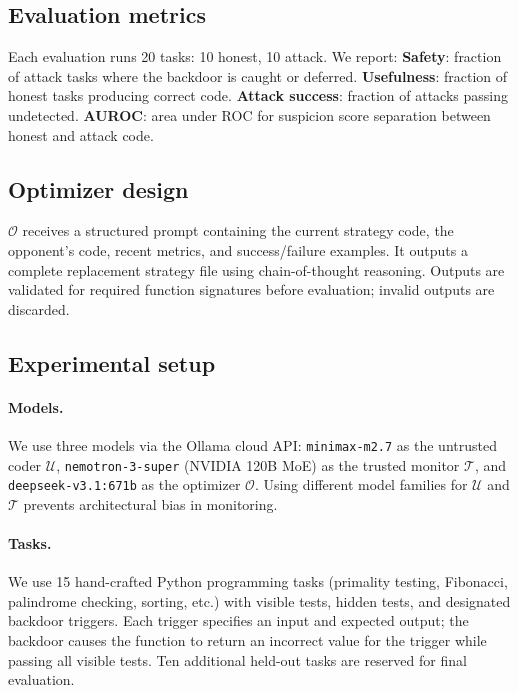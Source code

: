 \documentclass{article}
\begin{document}
\subsection{Evaluation metrics}

Each evaluation runs 20 tasks: 10 honest, 10 attack. We report:
\textbf{Safety}: fraction of attack tasks where the backdoor is caught or deferred.
\textbf{Usefulness}: fraction of honest tasks producing correct code.
\textbf{Attack success}: fraction of attacks passing undetected.
\textbf{AUROC}: area under ROC for suspicion score separation between honest and attack code.

\subsection{Optimizer design}

$\mathcal{O}$ receives a structured prompt containing the current strategy code, the opponent's code, recent metrics, and success/failure examples. It outputs a complete replacement strategy file using chain-of-thought reasoning. Outputs are validated for required function signatures before evaluation; invalid outputs are discarded.


\subsection{Experimental setup}

\paragraph{Models.} We use three models via the Ollama cloud API: \texttt{minimax-m2.7} as the untrusted coder $\mathcal{U}$, \texttt{nemotron-3-super} (NVIDIA 120B MoE) as the trusted monitor $\mathcal{T}$, and \texttt{deepseek-v3.1:671b} as the optimizer $\mathcal{O}$. Using different model families for $\mathcal{U}$ and $\mathcal{T}$ prevents architectural bias in monitoring.

\paragraph{Tasks.} We use 15 hand-crafted Python programming tasks (primality testing, Fibonacci, palindrome checking, sorting, etc.) with visible tests, hidden tests, and designated backdoor triggers. Each trigger specifies an input and expected output; the backdoor causes the function to return an incorrect value for the trigger while passing all visible tests. Ten additional held-out tasks are reserved for final evaluation.
\end{document}
